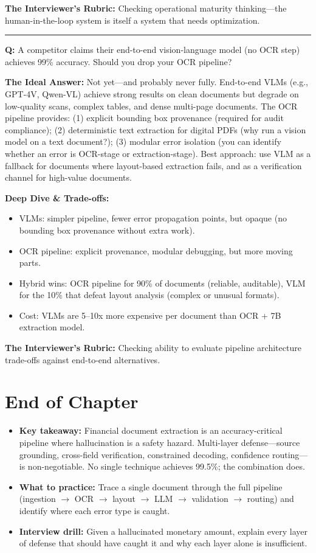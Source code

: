\textbf{The Interviewer's Rubric:} Checking operational maturity thinking---the human-in-the-loop system is itself a system that needs optimization.

\bigskip\hrule\bigskip

\textbf{Q:} A competitor claims their end-to-end vision-language model (no OCR step) achieves 99\% accuracy. Should you drop your OCR pipeline?

\textbf{The Ideal Answer:} Not yet---and probably never fully. End-to-end VLMs (e.g., GPT-4V, Qwen-VL) achieve strong results on clean documents but degrade on low-quality scans, complex tables, and dense multi-page documents. The OCR pipeline provides: (1) explicit bounding box provenance (required for audit compliance); (2) deterministic text extraction for digital PDFs (why run a vision model on a text document?); (3) modular error isolation (you can identify whether an error is OCR-stage or extraction-stage). Best approach: use VLM as a fallback for documents where layout-based extraction fails, and as a verification channel for high-value documents.

\textbf{Deep Dive \& Trade-offs:}
\begin{itemize}
  \item VLMs: simpler pipeline, fewer error propagation points, but opaque (no bounding box provenance without extra work).
  \item OCR pipeline: explicit provenance, modular debugging, but more moving parts.
  \item Hybrid wins: OCR pipeline for 90\% of documents (reliable, auditable), VLM for the 10\% that defeat layout analysis (complex or unusual formats).
  \item Cost: VLMs are 5--10x more expensive per document than OCR + 7B extraction model.
\end{itemize}

\textbf{The Interviewer's Rubric:} Checking ability to evaluate pipeline architecture trade-offs against end-to-end alternatives.

\section*{End of Chapter}

\begin{itemize}
  \item \textbf{Key takeaway:} Financial document extraction is an accuracy-critical pipeline where hallucination is a safety hazard. Multi-layer defense---source grounding, cross-field verification, constrained decoding, confidence routing---is non-negotiable. No single technique achieves 99.5\%; the combination does.
  \item \textbf{What to practice:} Trace a single document through the full pipeline (ingestion $\rightarrow$ OCR $\rightarrow$ layout $\rightarrow$ LLM $\rightarrow$ validation $\rightarrow$ routing) and identify where each error type is caught.
  \item \textbf{Interview drill:} Given a hallucinated monetary amount, explain every layer of defense that should have caught it and why each layer alone is insufficient.
\end{itemize}
